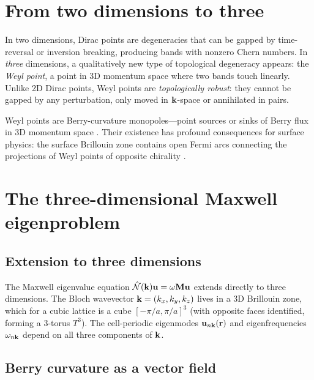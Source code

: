 
\section{From two dimensions to three}
\label{sec:ch15-2d-to-3d}

In two dimensions, Dirac points are degeneracies that can be gapped by
time-reversal or inversion breaking, producing bands with nonzero Chern
numbers.  In \emph{three} dimensions, a qualitatively new type of
topological degeneracy appears: the \emph{Weyl point}, a point in 3D
momentum space where two bands touch linearly.  Unlike 2D Dirac points,
Weyl points are \emph{topologically robust}: they cannot be gapped by
any perturbation, only moved in $\mathbf{k}$-space or annihilated in pairs.

Weyl points are Berry-curvature monopoles---point sources or sinks of
Berry flux in 3D momentum space \cite{ozawa2018topological}.  Their existence has profound
consequences for surface physics: the surface Brillouin zone contains
open Fermi arcs connecting the projections of Weyl points of opposite
chirality
\cite{hsieh2008topological,armitage2018weyl}.

\section{The three-dimensional Maxwell eigenproblem}
\label{sec:ch15-3d-maxwell}

\subsection{Extension to three dimensions}
\label{sec:ch15-extension}

The Maxwell eigenvalue equation $\hat{\mathcal{N}}(\mathbf{k})\mathbf{u}=\omega\mathbf{M}
\mathbf{u}$ extends directly to three dimensions.  The Bloch wavevector
$\mathbf{k}=(k_x,k_y,k_z)$ lives in a 3D Brillouin zone, which for a cubic
lattice is a cube $[-\pi/a,\pi/a]^3$ (with opposite faces identified,
forming a 3-torus $T^3$).  The cell-periodic eigenmodes
$\mathbf{u}_{n\mathbf{k}}(\mathbf{r})$ and eigenfrequencies $\omega_{n\mathbf{k}}$
depend on all three components of $\mathbf{k}$.

\subsection{Berry curvature as a vector field}
\label{sec:ch15-berry-vector}

